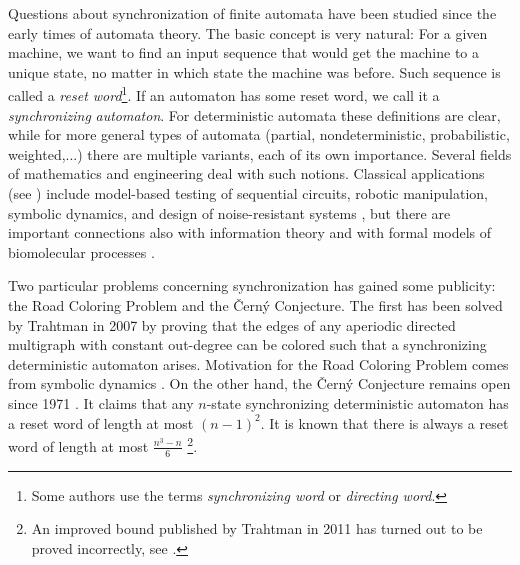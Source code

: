 \documentclass{ws-ijmpc}
\begin{document}
Questions about synchronization of finite automata have been studied
since the early times of automata theory. The basic concept is very
natural: For a given machine, we want to find an input sequence that
would get the machine to a unique state, no matter in which state
the machine was before. Such sequence is called a \emph{reset word}\footnote{Some authors use the terms \emph{synchronizing word} or \emph{directing
word}.}. If an automaton has some reset word, we call it a \emph{synchronizing}
\emph{automaton}. For deterministic automata these definitions are
clear, while for more general types of automata (partial, nondeterministic,
probabilistic, weighted,...) there are multiple variants, each of
its own importance. Several fields of mathematics and engineering
deal with such notions. Classical applications (see \citep{VOL1short})
include model-based testing of sequential circuits, robotic manipulation,
symbolic dynamics, and design of noise-resistant systems \citep{DEY1},
but there are important connections also with information theory \citep{TRS1}
and with formal models of biomolecular processes \citep{BON1}. 

Two particular problems concerning synchronization has gained some
publicity: the Road Coloring Problem and the \v{C}ern\'{y} Conjecture.
The first has been solved by Trahtman \citep{TRA6ijm} in 2007 by
proving that the edges of any aperiodic directed multigraph with constant
out-degree can be colored such that a synchronizing deterministic
automaton arises. Motivation for the Road Coloring Problem comes from
symbolic dynamics \citep{ADL1}. On the other hand, the \v{C}ern\'{y}
Conjecture remains open since 1971 \citep{CER2}. It claims that any
$n$-state synchronizing deterministic automaton has a reset word
of length at most $\left(n-1\right)^{2}$. It is known that there
is always a reset word of length at most $\frac{n^{3}-n}{6}$ \citep{PIN2}\footnote{An improved bound published by Trahtman \citep{TRA1} in 2011 has
turned out to be proved incorrectly, see \citep{GON1}.}.
\end{document}
